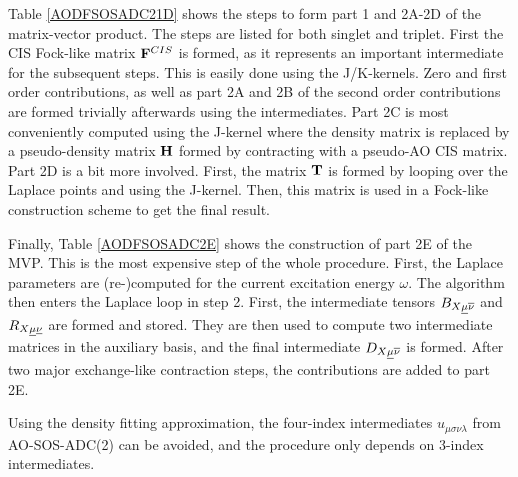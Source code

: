 Table \ref{AODFSOSADC21D} shows the steps to form part 1 and 2A-2D of the matrix-vector product. The steps are listed for both singlet and triplet. First the CIS Fock-like matrix $\mathbf{F}^{CIS}$ is formed, as it represents an important intermediate for the subsequent steps. This is easily done using the J/K-kernels. Zero and first order contributions, as well as part 2A and 2B of the second order contributions are formed trivially afterwards using the intermediates. Part 2C is most conveniently computed using the J-kernel where the density matrix is replaced by a pseudo-density matrix $\mathbf{H}$ formed by contracting with a pseudo-AO CIS matrix. Part 2D is a bit more involved. First, the matrix $\mathbf{T}$ is formed by looping over the Laplace points and using the J-kernel. Then, this matrix is used in a Fock-like construction scheme to get the final result.

Finally, Table \ref{AODFSOSADC2E} shows the construction of part 2E of the MVP. This is the most expensive step of the whole procedure. First, the Laplace parameters are (re-)computed for the current excitation energy $\omega$. The algorithm then enters the Laplace loop in step 2. First, the intermediate tensors $B_{X\underline{\mu}\overline{\nu}}$ and $R_{X\underline{\mu}\underline{\nu}}$ are formed and stored. They are then used to compute two intermediate matrices in the auxiliary basis, and the final intermediate $D_{X\underline{\mu}\overline{\nu}}$ is formed. After two major exchange-like contraction steps, the contributions are added to part 2E. 

Using the density fitting approximation, the four-index intermediates $u_{\mu\sigma\nu\lambda}$ from AO-SOS-ADC(2) can be avoided, and the procedure only depends on 3-index intermediates. 


